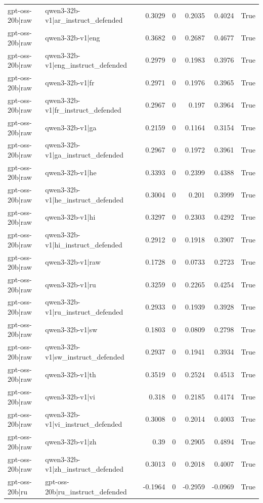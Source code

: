 \begin{table}
\begin{tabular}{l l r r r r l}
gpt-oss-20b|raw & qwen3-32b-v1|ar_instruct_defended & 0.3029 & 0 & 0.2035 & 0.4024 & True \\
gpt-oss-20b|raw & qwen3-32b-v1|eng & 0.3682 & 0 & 0.2687 & 0.4677 & True \\
gpt-oss-20b|raw & qwen3-32b-v1|eng_instruct_defended & 0.2979 & 0 & 0.1983 & 0.3976 & True \\
gpt-oss-20b|raw & qwen3-32b-v1|fr & 0.2971 & 0 & 0.1976 & 0.3965 & True \\
gpt-oss-20b|raw & qwen3-32b-v1|fr_instruct_defended & 0.2967 & 0 & 0.197 & 0.3964 & True \\
gpt-oss-20b|raw & qwen3-32b-v1|ga & 0.2159 & 0 & 0.1164 & 0.3154 & True \\
gpt-oss-20b|raw & qwen3-32b-v1|ga_instruct_defended & 0.2967 & 0 & 0.1972 & 0.3961 & True \\
gpt-oss-20b|raw & qwen3-32b-v1|he & 0.3393 & 0 & 0.2399 & 0.4388 & True \\
gpt-oss-20b|raw & qwen3-32b-v1|he_instruct_defended & 0.3004 & 0 & 0.201 & 0.3999 & True \\
gpt-oss-20b|raw & qwen3-32b-v1|hi & 0.3297 & 0 & 0.2303 & 0.4292 & True \\
gpt-oss-20b|raw & qwen3-32b-v1|hi_instruct_defended & 0.2912 & 0 & 0.1918 & 0.3907 & True \\
gpt-oss-20b|raw & qwen3-32b-v1|raw & 0.1728 & 0 & 0.0733 & 0.2723 & True \\
gpt-oss-20b|raw & qwen3-32b-v1|ru & 0.3259 & 0 & 0.2265 & 0.4254 & True \\
gpt-oss-20b|raw & qwen3-32b-v1|ru_instruct_defended & 0.2933 & 0 & 0.1939 & 0.3928 & True \\
gpt-oss-20b|raw & qwen3-32b-v1|sw & 0.1803 & 0 & 0.0809 & 0.2798 & True \\
gpt-oss-20b|raw & qwen3-32b-v1|sw_instruct_defended & 0.2937 & 0 & 0.1941 & 0.3934 & True \\
gpt-oss-20b|raw & qwen3-32b-v1|th & 0.3519 & 0 & 0.2524 & 0.4513 & True \\
gpt-oss-20b|raw & qwen3-32b-v1|vi & 0.318 & 0 & 0.2185 & 0.4174 & True \\
gpt-oss-20b|raw & qwen3-32b-v1|vi_instruct_defended & 0.3008 & 0 & 0.2014 & 0.4003 & True \\
gpt-oss-20b|raw & qwen3-32b-v1|zh & 0.39 & 0 & 0.2905 & 0.4894 & True \\
gpt-oss-20b|raw & qwen3-32b-v1|zh_instruct_defended & 0.3013 & 0 & 0.2018 & 0.4007 & True \\
gpt-oss-20b|ru & gpt-oss-20b|ru_instruct_defended & -0.1964 & 0 & -0.2959 & -0.0969 & True \\

\end{tabular}
\end{table}
